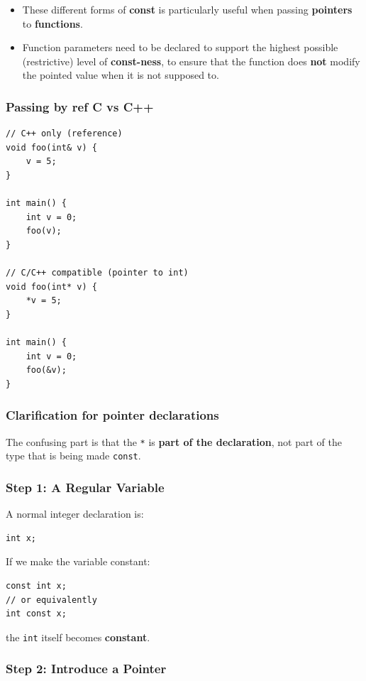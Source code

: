 \documentclass[10pt]{article}
\begin{document}
\begin{itemize}
	\item These different forms of \textbf{const} is particularly useful when passing \textbf{pointers} to \textbf{functions}.
	\item Function parameters need to be declared to support the highest possible (restrictive) level of \textbf{const-ness}, to ensure that the function does \textbf{not} modify the pointed value when it is not supposed to.
\end{itemize}

\newpage
\subsubsection{Passing by ref C vs C++}

\begin{verbatim}
// C++ only (reference)
void foo(int& v) {
    v = 5;
}

int main() {
    int v = 0;
    foo(v);
}

// C/C++ compatible (pointer to int)
void foo(int* v) {
    *v = 5;
}

int main() {
    int v = 0;
    foo(&v);
}
\end{verbatim}

\newpage
\subsubsection{Clarification for pointer declarations}
The confusing part is that the \verb|*| is \textbf{part of the declaration}, not part of the type that is being made \verb|const|.

\subsubsection*{Step 1: A Regular Variable}

A normal integer declaration is:

\begin{verbatim}
int x;
\end{verbatim}

If we make the variable constant:

\begin{verbatim}
const int x;
// or equivalently
int const x;
\end{verbatim}

the \verb|int| itself becomes \textbf{constant}.

\subsubsection*{Step 2: Introduce a Pointer}
\end{document}
